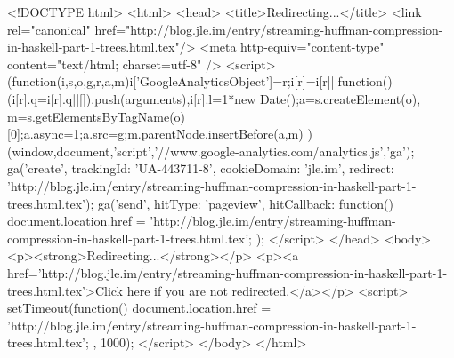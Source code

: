 <!DOCTYPE html>
<html>
<head>
<title>Redirecting...</title>
<link rel="canonical" href="http://blog.jle.im/entry/streaming-huffman-compression-in-haskell-part-1-trees.html.tex"/>
<meta http-equiv="content-type" content="text/html; charset=utf-8" />
<script>
(function(i,s,o,g,r,a,m){i['GoogleAnalyticsObject']=r;i[r]=i[r]||function(){
(i[r].q=i[r].q||[]).push(arguments)},i[r].l=1*new Date();a=s.createElement(o),
m=s.getElementsByTagName(o)[0];a.async=1;a.src=g;m.parentNode.insertBefore(a,m)
})(window,document,'script','//www.google-analytics.com/analytics.js','ga');
ga('create', { trackingId: 'UA-443711-8', cookieDomain: 'jle.im', redirect: 'http://blog.jle.im/entry/streaming-huffman-compression-in-haskell-part-1-trees.html.tex'});
ga('send', { hitType: 'pageview', hitCallback: function() { document.location.href = 'http://blog.jle.im/entry/streaming-huffman-compression-in-haskell-part-1-trees.html.tex'; } });
</script>
</head>
<body>
  <p><strong>Redirecting...</strong></p>
  <p><a href='http://blog.jle.im/entry/streaming-huffman-compression-in-haskell-part-1-trees.html.tex'>Click here if you are not redirected.</a></p>
  <script>
    setTimeout(function() { document.location.href = 'http://blog.jle.im/entry/streaming-huffman-compression-in-haskell-part-1-trees.html.tex'; }, 1000);
  </script>
</body>
</html>
